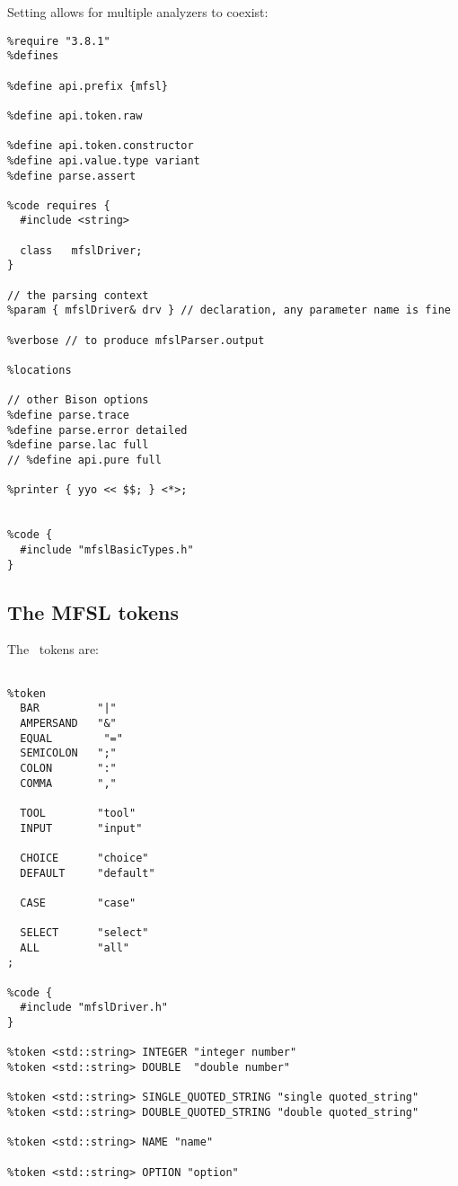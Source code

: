 Setting  allows for multiple analyzers to coexist:
\begin{lstlisting}[language=Bison]
%skeleton "lalr1.cc" // -*- C++ -*-
%require "3.8.1"
%defines

%define api.prefix {mfsl}

%define api.token.raw

%define api.token.constructor
%define api.value.type variant
%define parse.assert

%code requires {
  #include <string>

  class   mfslDriver;
}

// the parsing context
%param { mfslDriver& drv } // declaration, any parameter name is fine

%verbose // to produce mfslParser.output

%locations

// other Bison options
%define parse.trace
%define parse.error detailed
%define parse.lac full
// %define api.pure full

%printer { yyo << $$; } <*>;


%code {
  #include "mfslBasicTypes.h"
}
\end{lstlisting}


\subsection{The MFSL tokens}

The \mfslLang\ tokens are:
\begin{lstlisting}[language=Bison]
%define api.token.prefix {MFSL_TOK_}

%token
  BAR         "|"
  AMPERSAND   "&"
  EQUAL        "="
  SEMICOLON   ";"
  COLON       ":"
  COMMA       ","

  TOOL        "tool"
  INPUT       "input"

  CHOICE      "choice"
  DEFAULT     "default"

  CASE        "case"

  SELECT      "select"
  ALL         "all"
;

%code {
  #include "mfslDriver.h"
}

%token <std::string> INTEGER "integer number"
%token <std::string> DOUBLE  "double number"

%token <std::string> SINGLE_QUOTED_STRING "single quoted_string"
%token <std::string> DOUBLE_QUOTED_STRING "double quoted_string"

%token <std::string> NAME "name"

%token <std::string> OPTION "option"
\end{lstlisting}


